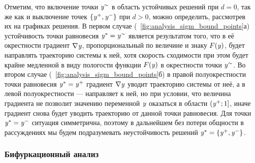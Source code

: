 Отметим, что включение точки $\mathit{y}^{\sim}$ в область устойчивых решений при $d = 0$, так же как и выключение точек $\left\{\mathit{y}^{+}, \mathit{y}^{-}\right\}$ при $d > 0$, можно определить, рассмотрев их на графиках решения. В первом случае (\seefigure~\ref{fig:analysis_sigm_bound_points}а) устойчивость точки равновесия $\mathit{y}^{*} = \mathit{y}^{\sim}$ является результатом того, что в её окрестности градиент $\nabla\mathit{y}$, пропорциональный по величине и знаку $F(\mathit{y})$, будет направлять траекторию системы к ней, хотя скорость сходимости при этом будет крайне медленной в виду пологости функции $F(\mathit{y})$ в окрестности точки $\mathit{y}^{\sim}$. Во втором случае (\seefigure~\ref{fig:analysis_sigm_bound_points}б) в правой полуокрестности точки равновесия $\mathit{y}^{*} = \mathit{y}^{+}$ градиент $\nabla\mathit{y}$ уводит траекторию системы от неё, а в левой полуокрестности --- направляет к ней, но при условии, что величина градиента не позволит значению переменной $\mathit{y}$ оказаться в области $\left(\mathit{y}^{+}; 1\right]$, иначе градиент снова будет уводить траекторию от данной точки равновесия. Для точки $\mathit{y}^{*} = \mathit{y}^{-}$ ситуация симметрична, поэтому в дальнейшем без потери общности в рассуждениях мы будем подразумевать неустойчивость решений $\mathit{y}^{*} = \left\{\mathit{y}^{+}, \mathit{y}^{-}\right\}$.


\subsubsection{Бифуркационный анализ}

